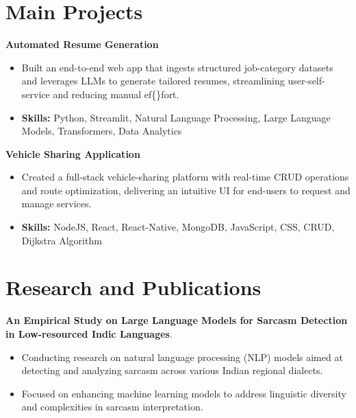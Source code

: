 \documentclass[a4paper,11pt]{article}
\begin{document}
\section{\textbf{Main Projects}}

\vspace{1mm}
  \textbf{Automated Resume Generation  }
\vspace{-1.5mm} %
\begin{itemize}
  \item Built an end-to-end web app that ingests structured job-category datasets and leverages LLMs to generate tailored resumes, streamlining user-self-service and reducing manual ef\{\}fort.
\vspace{-3mm}
  \item \textbf{Skills:} Python, Streamlit, Natural Language Processing, Large Language Models, Transformers, Data Analytics
\end{itemize}


\vspace{1mm}
   \textbf{Vehicle Sharing Application }
\vspace{-1.5mm} %
\begin{itemize}
  \item Created a full-stack vehicle-sharing platform with real-time CRUD operations and route optimization, delivering an intuitive UI for end-users to request and manage services.
\vspace{-3mm}
  \item \textbf{Skills:} NodeJS, React, React-Native, MongoDB, JavaScript, CSS, CRUD, Dijkstra Algorithm
\end{itemize}



\section{\textbf{Research and Publications} \hfill }
\vspace{1mm}
  \textbf{An Empirical Study on Large Language Models for Sarcasm Detection in Low-resourced Indic Languages}.
\vspace{-1mm} %
\begin{itemize}
  \item Conducting research on natural language processing (NLP) models aimed at detecting and analyzing sarcasm across various Indian regional dialects.
\vspace{-3mm}
  \item Focused on enhancing machine learning models to address linguistic diversity and complexities in sarcasm interpretation.
\end{itemize}
\end{document}
